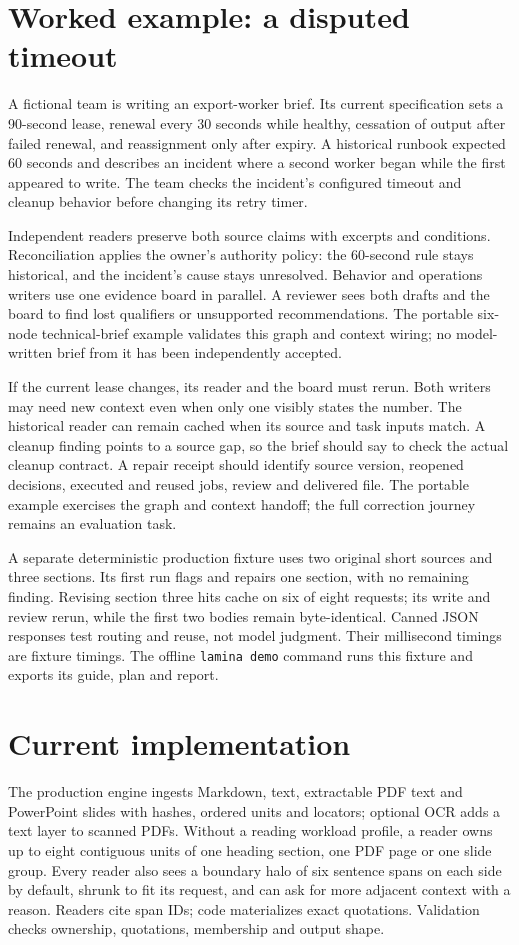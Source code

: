 \documentclass[11pt,letterpaper]{article}
\begin{document}
\section{Worked example: a disputed timeout}
A fictional team is writing an export-worker brief. Its current specification sets a 90-second lease, renewal every 30 seconds while healthy, cessation of output after failed renewal, and reassignment only after expiry. A historical runbook expected 60 seconds and describes an incident where a second worker began while the first appeared to write. The team checks the incident's configured timeout and cleanup behavior before changing its retry timer.

Independent readers preserve both source claims with excerpts and conditions. Reconciliation applies the owner's authority policy: the 60-second rule stays historical, and the incident's cause stays unresolved. Behavior and operations writers use one evidence board in parallel. A reviewer sees both drafts and the board to find lost qualifiers or unsupported recommendations. The portable six-node technical-brief example validates this graph and context wiring; no model-written brief from it has been independently accepted.

If the current lease changes, its reader and the board must rerun. Both writers may need new context even when only one visibly states the number. The historical reader can remain cached when its source and task inputs match. A cleanup finding points to a source gap, so the brief should say to check the actual cleanup contract. A repair receipt should identify source version, reopened decisions, executed and reused jobs, review and delivered file. The portable example exercises the graph and context handoff; the full correction journey remains an evaluation task.

A separate deterministic production fixture uses two original short sources and three sections. Its first run flags and repairs one section, with no remaining finding. Revising section three hits cache on six of eight requests; its write and review rerun, while the first two bodies remain byte-identical. Canned JSON responses test routing and reuse, not model judgment. Their millisecond timings are fixture timings. The offline \texttt{lamina demo} command runs this fixture and exports its guide, plan and report.

\section{Current implementation}
The production engine ingests Markdown, text, extractable PDF text and PowerPoint slides with hashes, ordered units and locators; optional OCR adds a text layer to scanned PDFs. Without a reading workload profile, a reader owns up to eight contiguous units of one heading section, one PDF page or one slide group. Every reader also sees a boundary halo of six sentence spans on each side by default, shrunk to fit its request, and can ask for more adjacent context with a reason. Readers cite span IDs; code materializes exact quotations. Validation checks ownership, quotations, membership and output shape.
\end{document}
